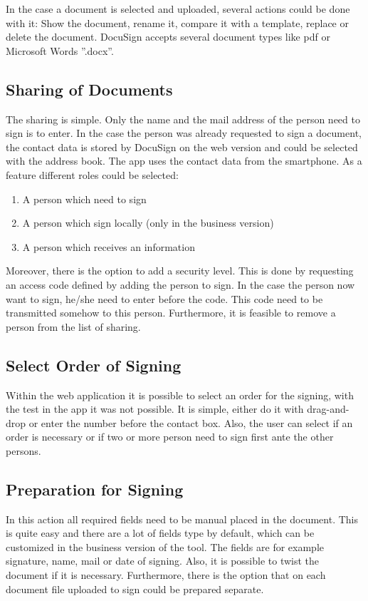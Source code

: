 In the case a document is selected and uploaded, several actions could be done with it: Show the document, rename it, compare it with a template, replace or delete the document. DocuSign accepts several document types like \gls{pdf} or Microsoft Words ''.docx''.

\subsection{Sharing of Documents}
The sharing is simple. Only the name and the mail address of the person need to sign is to enter. In the case the person was already requested to sign a document, the contact data is stored by DocuSign on the web version and could be selected with the address book. The \gls{app} uses the contact data from the smartphone.
As a feature different roles could be selected:
\begin{enumerate}
	\item A person which need to sign
	\item A person which sign locally (only in the business version)
	\item A person which receives an information
\end{enumerate}
Moreover, there is the option to add a security level. This is done by requesting an access code defined by adding the person to sign. In the case the person now want to sign, he/she need to enter before the code. This code need to be transmitted somehow to this person. Furthermore, it is feasible to remove a person from the list of sharing. 

\subsection{Select Order of Signing}
Within the web application it is possible to select an order for the signing, with the test in the \gls{app} it was not possible. It is simple, either do it with drag-and-drop or enter the number before the contact box. Also, the user can select if an order is necessary or if two or more person need to sign first ante the other persons.

\subsection{Preparation for Signing}
In this action all required fields need to be manual placed in the document. This is quite easy and there are a lot of fields type by default, which can be customized in the business version of the tool. The fields are for example signature, name, mail or date of signing.
Also, it is possible to twist the document if it is necessary. Furthermore, there is the option that on each document file uploaded to sign could be prepared separate. 

